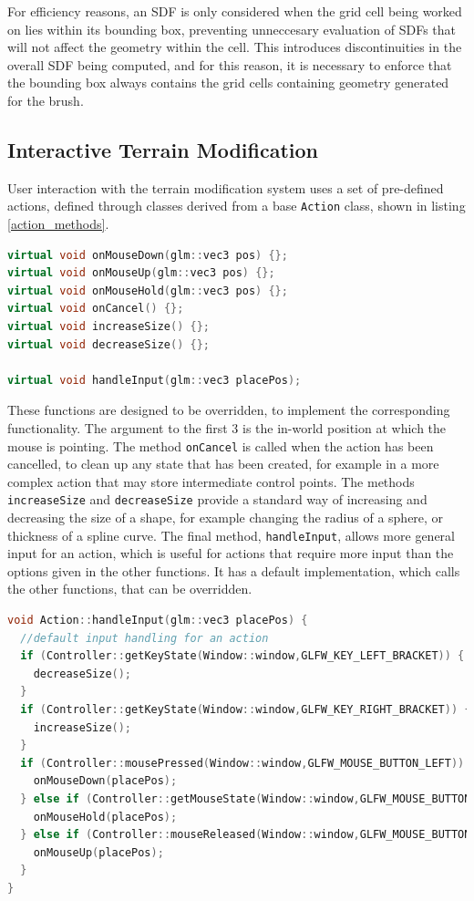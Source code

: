 \documentclass[11pt]{article}
\begin{document}
For efficiency reasons, an SDF is only considered when the grid cell being worked on lies within its bounding box,
preventing unneccesary evaluation of SDFs that will not affect the geometry within the cell. This introduces discontinuities in the overall SDF being computed, and for this reason, it is necessary to enforce that the bounding box always contains the grid cells containing geometry generated for the brush.

\subsection{Interactive Terrain Modification}
User interaction with the terrain modification system uses a set of pre-defined actions, defined through classes derived from a base \texttt{Action} class, shown in listing \ref{action_methods}.

\begin{lstlisting}[language=C++,label={action_methods},caption={Methods of the \texttt{Action} class responsible for handling user interaction.}]
virtual void onMouseDown(glm::vec3 pos) {};
virtual void onMouseUp(glm::vec3 pos) {};
virtual void onMouseHold(glm::vec3 pos) {};
virtual void onCancel() {};
virtual void increaseSize() {};
virtual void decreaseSize() {};

virtual void handleInput(glm::vec3 placePos);
\end{lstlisting}
These functions are designed to be overridden, to implement the corresponding functionality. The argument to the first 3 is the in-world position at which the mouse is pointing. The method \texttt{onCancel} is called when the action has been cancelled, to clean up any state that has been created, for example in a more complex action that may store intermediate control points. The methods \texttt{increaseSize} and \texttt{decreaseSize} provide a standard way of increasing and decreasing the size of a shape, for example changing the radius of a sphere, or thickness of a spline curve. The final method, \texttt{handleInput}, allows more general input for an action, which is useful for actions that require more input than the options given in the other functions. It has a default implementation, which calls the other functions, that can be overridden.
\begin{lstlisting}[language=C++,label={action_handleinput},caption={Default implementation of \texttt{handleInput}.}]
void Action::handleInput(glm::vec3 placePos) {
  //default input handling for an action
  if (Controller::getKeyState(Window::window,GLFW_KEY_LEFT_BRACKET)) {
    decreaseSize();
  }
  if (Controller::getKeyState(Window::window,GLFW_KEY_RIGHT_BRACKET)) {
    increaseSize();
  }
  if (Controller::mousePressed(Window::window,GLFW_MOUSE_BUTTON_LEFT)) {
    onMouseDown(placePos);
  } else if (Controller::getMouseState(Window::window,GLFW_MOUSE_BUTTON_LEFT)) {
    onMouseHold(placePos);
  } else if (Controller::mouseReleased(Window::window,GLFW_MOUSE_BUTTON_LEFT)) {
    onMouseUp(placePos);
  }
}
\end{lstlisting}
\end{document}
